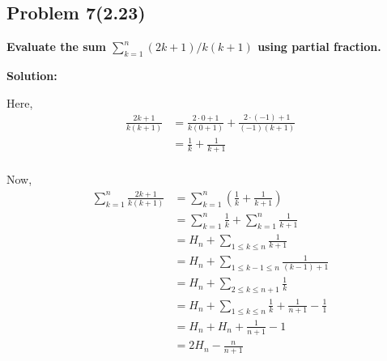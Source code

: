 \subsection{Problem 7(2.23)}
\textbf{Evaluate the sum $ \sum_{k=1}^{n} (2k+1)/k(k+1)$ using partial fraction.}
\par

\begin{flushleft}
    \textbf{Solution: }
    \par
    Here,
    $$
        \begin{aligned}
            \frac{2k+1}{k(k+1)} & = \frac{2\cdot0 + 1}{k(0+1)} + \frac{2 \cdot (-1) + 1}{(-1)(k+1)} \\
            & = \frac{1}{k} + \frac{1}{k+1} \\
        \end{aligned}
    $$

    Now, 
    $$
    \begin{aligned}
        \sum_{k=1}^{n} \frac{2k+1}{k(k+1)} & =  \sum_{k=1}^{n} \left( \frac{1}{k} + \frac{1}{k+1} \right)  \\
        & = \sum_{k=1}^{n} \frac{1}{k} + \sum_{k=1}^{n} \frac{1}{k+1} \\
        & = H_n + \sum_{1 \leq k \leq n} \frac{1}{k+1} \\
        & = H_n + \sum_{1 \leq k-1 \leq n} \frac{1}{(k-1)+1} \\
        & = H_n + \sum_{2 \leq k \leq n+1} \frac{1}{k} \\
        & = H_n +  \sum_{1 \leq k \leq n} \frac{1}{k} + \frac{1}{n+1} - \frac{1}{1}\\
        & = H_n + H_n + \frac{1}{n+1} - 1 \\
        & = 2H_n - \frac{n}{n+1} \\
    \end{aligned}
    $$

\end{flushleft}